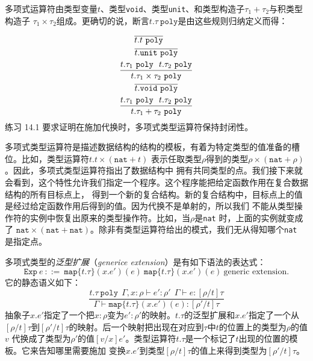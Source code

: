 多项式运算符由类型变量$t$、类型\texttt{void}、类型\texttt{unit}、和类型构造子$\tau_1 + \tau_2$与积类型构造子
$\tau_1\times\tau_2$组成。更确切的说，断言$t.\tau\ \texttt{poly}$是由这些规则归纳定义而得：

\begin{subequations}
	\begin{gather}
	\overline{t.t\ \texttt{poly}} \newline\\
	\overline{t.\texttt{unit}\ \texttt{poly}} \\
	\frac{t.\tau_1\ \texttt{poly}\ \ t.\tau_2\ \texttt{poly}}{t.\tau_1\times \tau_2\ \texttt{poly}} \\
	\overline{t.\texttt{void}\ \texttt{poly}} \\
	\frac{t.\tau_1\ \texttt{poly}\ \ t.\tau_2\ \texttt{poly}}{t.\tau_1 + \tau_2\ \texttt{poly}}
	\end{gather}
\end{subequations}
练习 14.1 要求证明在施加代换时，多项式类型运算符保持封闭性。

多项式类型运算符是描述数据结构的结构的模板，有着为特定类型的值准备的槽位。比如，类型运算符$t.t\times(\texttt{nat} + t)$
表示任取类型$\rho$得到的类型$\rho\times(\texttt{nat} + \rho)$。因此，多项式类型运算符指出了数据结构中
拥有共同类型的点。我们接下来就会看到，这个特性允许我们指定一个程序。这个程序能把给定函数作用在复合数据结构的所有目标点上，
得到一个新的复合结构。新的复合结构中，目标点上的值是经过给定函数作用后得到的值。因为代换不是单射的，所以我们
不能从类型操作符的实例中恢复出原来的类型操作符。比如，当$\rho$是\texttt{nat} 时，上面的实例就变成了
$\texttt{nat}\times(\texttt{nat} +\texttt{nat})$。除非有类型运算符给出的模式，我们无从得知哪个\texttt{nat} 是指定点。

多项式类型的\textit{泛型扩展}（\textit{generice extension}）是有如下语法的表达式：
$$\texttt{Exp}\ e\ ::=\ \texttt{map}\{t.\tau\}(x.e')(e)\ \texttt{map}\{t.\tau\}(x.e')(e)\ \text{generic extension.}$$
它的静态语义如下：
\begin{equation} \label{eq:generic-extension-statics}
\frac{t.\tau\ \texttt{poly}\ \ \Gamma,x:\rho\vdash e':\rho'\ \ \Gamma\vdash e:[\rho/t]\tau}
{\Gamma\vdash \texttt{map}\{t.\tau\}(x.e')(e):[\rho'/t]\tau}
\end{equation}
抽象子$x.e'$指定了一个把$x:\rho$变为$e':\rho'$的映射。$t.\tau$的泛型扩展和$x.e'$指定了一个从
$[\rho/t]\tau$到$[\rho'/t]\tau$的映射。后一个映射把出现在对应到$\tau$中$t$的位置上的类型为$\rho$的值$v$
代换成了类型为$\rho'$的值$[v/x]e'$。类型运算符$t.\tau$是一个标记了$t$出现的位置的模板。它来告知哪里需要施加
变换$x.e'$到类型$[\rho/t]\tau$的值上来得到类型为$[\rho'/t]\tau$。


